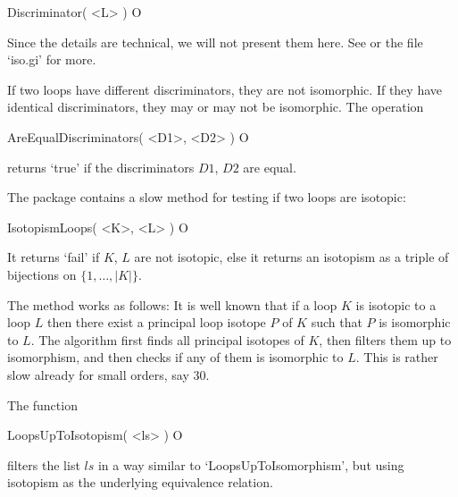 \>Discriminator( <L> ) O

Since the details are technical, we will not present them here. See \cite{Vo}
or the file `iso.gi' for more.

If two loops have different discriminators, they are not isomorphic. If they
have identical discriminators, they may or may not be isomorphic. The operation

\>AreEqualDiscriminators( <D1>, <D2> ) O

returns `true' if the discriminators $D1$, $D2$ are equal.


The package contains a slow method for testing if two loops are isotopic:

\>IsotopismLoops( <K>, <L> ) O

It returns `fail' if $K$, $L$ are not isotopic, else it returns an isotopism as
a triple of bijections on $\{1,\dots,|K|\}$.

The method works as follows: It is well known that if a loop $K$ is isotopic to
a loop $L$ then there exist a principal loop isotope $P$ of $K$ such that $P$
is isomorphic to $L$. The algorithm first finds all principal isotopes of $K$,
then filters them up to isomorphism, and then checks if any of them is
isomorphic to $L$. This is rather slow already for small orders, say $30$.

The function

\>LoopsUpToIsotopism( <ls> ) O

filters the list $ls$ in a way similar to `LoopsUpToIsomorphism', but using
isotopism as the underlying equivalence relation.

